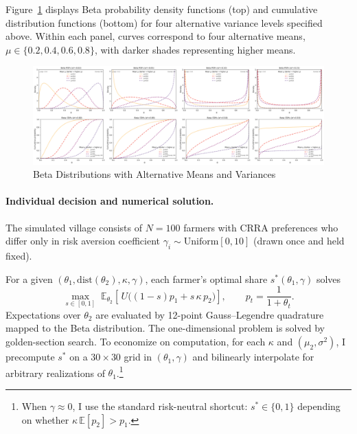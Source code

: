 Figure~\ref{fig:beta_pdf_cdf_grid} displays Beta probability density functions (top) and cumulative distribution functions (bottom) for four alternative variance levels specified above. Within each panel, curves correspond to four alternative means, $\mu \in \{0.2, 0.4, 0.6, 0.8\}$, with darker shades representing higher means.


\begin{figure}[ht!]
    \centering
    \includegraphics[width=\linewidth]{model_figures/beta_dist_PDF_CDF_grid_2x4.png}
    \caption{Beta Distributions with Alternative Means and Variances}
    \label{fig:beta_pdf_cdf_grid}
\end{figure}



\paragraph{Individual decision and numerical solution.}
The simulated village consists of $N=100$ farmers with CRRA preferences who differ only in risk aversion coefficient $\gamma_i\sim \mathrm{Uniform}[0,10]$ (drawn once and held fixed).

For a given $(\theta_1,\text{dist}(\theta_2),\kappa,\gamma)$, each farmer's optimal share $s^*(\theta_1,\gamma)$ solves
\[
\max_{s\in[0,1]} \; \mathbb{E}_{\theta_2}\!\left[\,U\!\big((1-s)p_1+s\,\kappa\,p_2\big)\right],
\qquad p_t=\frac{1}{1+\theta_t}.
\]
Expectations over $\theta_2$ are evaluated by 12-point Gauss--Legendre quadrature mapped to the Beta distribution. The one-dimensional problem is solved by golden-section search. To economize on computation, for each $\kappa$ and $(\mu_2,\sigma^2)$, I precompute $s^*$ on a $30\times 30$ grid in $(\theta_1,\gamma)$ and bilinearly interpolate for arbitrary realizations of $\theta_1$.\footnote{When $\gamma\approx 0$, I use the standard risk-neutral shortcut: $s^*\in\{0,1\}$ depending on whether $\kappa\,\mathbb{E}[p_2]>p_1$.}

